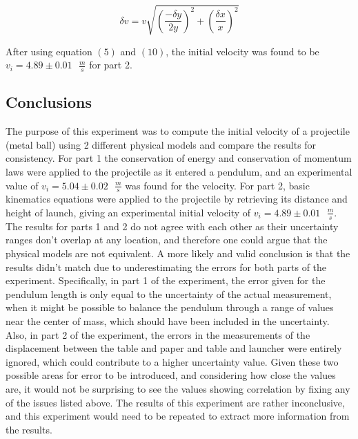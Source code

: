 \documentclass[11pt]{article}
\begin{document}
\begin{equation}
\delta v = v \sqrt{(\frac{-\delta y}{2y})^2 + (\frac{\delta x}{x})^2}
\end{equation}

After using equation \((5)\) and \((10)\), the initial velocity was found
to be \(v_i = 4.89 \pm 0.01\text{ }\frac {m}{s}\) for part 2.

\hypertarget{conclusions}{%
\subsection*{\centering Conclusions}\label{conclusions}}

The purpose of this experiment was to compute the initial velocity of a
projectile (metal ball) using 2 different physical models and compare
the results for consistency. For part 1 the conservation of energy and
conservation of momentum laws were applied to the projectile as it
entered a pendulum, and an experimental value of
\(v_i = 5.04 \pm 0.02\text{ }\frac {m}{s}\) was found for the velocity.
For part 2, basic kinematics equations were applied to the projectile by
retrieving its distance and height of launch, giving an experimental
initial velocity of \(v_i = 4.89 \pm 0.01\text{ }\frac {m}{s}\). The
results for parts 1 and 2 do not agree with each other as their
uncertainty ranges don't overlap at any location, and therefore one
could argue that the physical models are not equivalent. A more likely
and valid conclusion is that the results didn't match due to
underestimating the errors for both parts of the experiment.
Specifically, in part 1 of the experiment, the error given for the
pendulum length is only equal to the uncertainty of the actual
measurement, when it might be possible to balance the pendulum through a
range of values near the center of mass, which should have been included
in the uncertainty. Also, in part 2 of the experiment, the errors in the
measurements of the displacement between the table and paper and table
and launcher were entirely ignored, which could contribute to a
higher uncertainty value. Given these two possible areas for error to be introduced,
and considering how close the values are, it would not be surprising to
see the values showing correlation by fixing any of the issues listed
above. The results of this experiment are rather inconclusive, and this
experiment would need to be repeated to extract more information from
the results.


    
    
    
\end{document}
